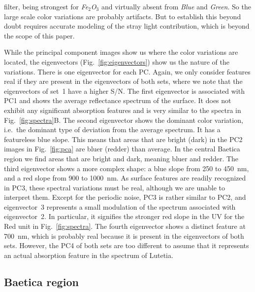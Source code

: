 \documentclass[3p,authoryear]{elsarticle}
\begin{document}
filter, being strongest for {\it Fe$_2$O$_3$} and virtually absent from {\it Blue} and {\it Green}. So the large scale color variations are probably artifacts. But to establish this beyond doubt requires accurate modeling of the stray light contribution, which is beyond the scope of this paper.

While the principal component images show us where the color variations are located, the eigenvectors (Fig.~\ref{fig:eigenvectors}) show us the nature of the variations. There is one eigenvector for each PC. Again, we only consider features real if they are present in the eigenvectors of both sets, where we note that the eigenvectors of set~1 have a higher S/N. The first eigenvector is associated with PC1 and shows the average reflectance spectrum of the surface. It does not exhibit any significant absorption features and is very similar to the spectra in Fig.~\ref{fig:spectra}B. The second eigenvector shows the dominant color variation, i.e.\ the dominant type of deviation from the average spectrum. It has a featureless blue slope. This means that areas that are bright (dark) in the PC2 images in Fig.~\ref{fig:pca} are bluer (redder) than average. In the central Baetica region we find areas that are bright and dark, meaning bluer and redder. The third eigenvector shows a more complex shape: a blue slope from 250 to 450~nm, and a red slope from 900 to 1000~nm. As surface features are readily recognized in PC3, these spectral variations must be real, although we are unable to interpret them. Except for the periodic noise, PC3 is rather similar to PC2, and eigenvector~3 represents a small modulation of the spectrum associated with eigenvector~2. In particular, it signifies the stronger red slope in the UV for the Red unit in Fig.~\ref{fig:spectra}. The fourth eigenvector shows a distinct feature at 700~nm, which is probably real because it is present in the eigenvectors of both sets. However, the PC4 of both sets are too different to assume that it represents an actual absorption feature in the spectrum of Lutetia.

\subsection{Baetica region}
\label{sec:baetica}
\end{document}
